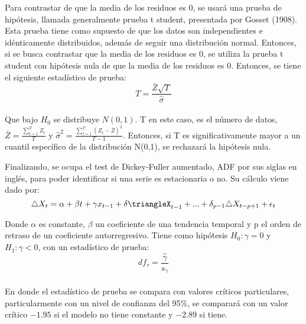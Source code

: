 \documentclass{report}
\begin{document}
Para contrastar de que la media de los residuos es 0, se usará una prueba de hipótesis, llamada generalmente prueba t student, presentada por Gosset (1908). Esta prueba tiene como supuesto de que los datos son independientes e idénticamente distribuidos, además de seguir una distribución normal. Entonces, si se busca contrastar que la media de los residuos es 0, se utiliza la prueba t student con hipótesis nula de que la media de los residuos es 0. Entonces, se tiene el siguiente estadístico de prueba:\\
    \begin{equation}
        T=\frac{\bar{Z}\sqrt{T}}{\hat{\sigma}}
    \end{equation}\\
    \vspace{0.5cm}
    Que bajo $H_{0}$ se distribuye $N(0,1)$. T en este caso, es el número de datos, $\bar{Z}=\frac{\sum_{t=1}^{T}Z_{t}}{T}$ y $\hat{\sigma}^{2}=\frac{\sum_{t=1}^{T}(Z_{t}-\bar{Z})^{2}}{T-1}$. Entonces, si T es significativamente mayor a un cuantil específico de la distribución N(0,1), se rechazará la hipótesis nula.

Finalizando, se ocupa el test de Dickey-Fuller aumentado, ADF por sus siglas en inglés, para poder identificar si una serie es estacionaria o no. Su cálculo viene dado por:\\

\begin{equation}
    \triangle X_{t}=\alpha +\beta t+\gamma x_{t-1} +\delta \triangleX_{t-1}+...+\delta_{p-1} \triangle X_{t-p+1}+\epsilon_{t}
\end{equation}

Donde $\alpha$ es constante, $\beta$ un coeficiente de una tendencia temporal y p el orden de retraso de un coeficiente autorregresivo. Tiene como hipótesis $H_{0}:\gamma =0$ y 
$H_{1}:\gamma <0$, con un estadístico de prueba:\\
\begin{equation}
    df_{\tau}=\frac{\hat{\gamma}}{\hat{s}_{\gamma}}
\end{equation}\\

En donde el estadístico de prueba se compara con valores críticos particulares, particularmente con un nivel de confianza del 95\%, se comparará con un valor crítico $-1.95$ si el modelo no tiene constante y $-2.89$ si tiene.\\
\end{document}
